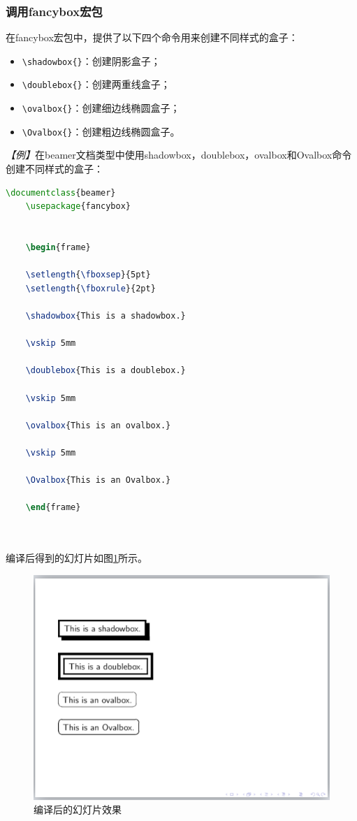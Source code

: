 \subsubsection{调用fancybox宏包}

在fancybox宏包中，提供了以下四个命令用来创建不同样式的盒子：
\begin{itemize}
    \item \texttt{\textbackslash{}shadowbox\{\}}：创建阴影盒子；
    \item \texttt{\textbackslash{}doublebox\{\}}：创建两重线盒子；
    \item \texttt{\textbackslash{}ovalbox\{\}}：创建细边线椭圆盒子；
    \item \texttt{\textbackslash{}Ovalbox\{\}}：创建粗边线椭圆盒子。
\end{itemize}

\emph{【例】}在beamer文档类型中使用shadowbox，doublebox，ovalbox和Ovalbox命令创建不同样式的盒子：
\begin{lstlisting}[language=TeX]
    \documentclass{beamer}
    \usepackage{fancybox}
    

    \begin{frame}

    \setlength{\fboxsep}{5pt}
    \setlength{\fboxrule}{2pt}

    \shadowbox{This is a shadowbox.}

    \vskip 5mm

    \doublebox{This is a doublebox.}

    \vskip 5mm

    \ovalbox{This is an ovalbox.}

    \vskip 5mm

    \Ovalbox{This is an Ovalbox.}

    \end{frame}

    
\end{lstlisting}

编译后得到的幻灯片如图\ref{fig:922}所示。

\begin{figure}[htbp]
    \centering
    \includegraphics[width = 0.6\linewidth]{images/ch_9/NEWexample09.png}
    \caption{编译后的幻灯片效果}
    \label{fig:922}
\end{figure}


